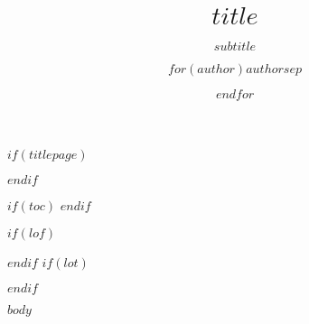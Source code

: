 \documentclass[$if(fontsize)$$fontsize$,$endif$]{$documentclass$}
\title{$title$}
\subtitle{$subtitle$}
\author{$for(author)$$author$$sep$ \and $endfor$}
\begin{document}
$if(titlepage)$
  \maketitle %
$endif$

\frontmatter %

$if(toc)$
  \tableofcontents
$endif$

$if(lof)$ \listoffigures $endif$ %
$if(lot)$ \listoftables $endif$ %


\mainmatter %

$body$ %

\backmatter %


\end{document}
